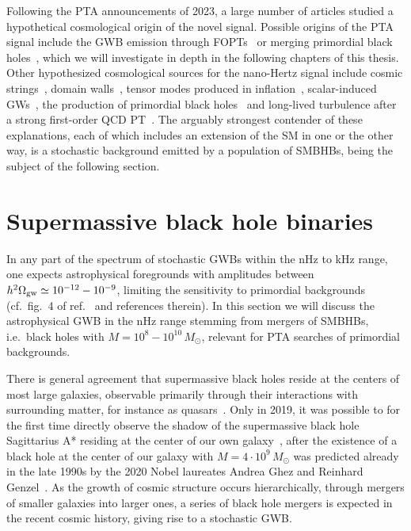 Following the \ac{PTA} announcements of 2023, a large number of articles studied a hypothetical cosmological origin of the novel signal. Possible origins of the \ac{PTA} signal include the \ac{GWB} emission through \acp{FOPT}~\cite{Nakai:2020oit, Ratzinger:2020koh, NANOGrav:2021flc, Bringmann:2023opz, Madge:2023cak} or merging primordial black holes~\cite{Depta:2023qst, Gouttenoire:2023nzr}, which we will investigate in depth in the following chapters of this thesis. Other hypothesized cosmological sources for the nano-Hertz signal include cosmic strings~\cite{Ellis:2023tsl, Buchmuller:2023aus, Blasi:2020mfx, Ellis:2020ena, Buchmuller:2020lbh}, domain walls~\cite{Gouttenoire:2023ftk}, tensor modes produced in inflation~\cite{Vagnozzi:2023lwo,Vagnozzi:2020gtf,Ashoorioon:2022raz}, scalar-induced \acp{GW}~\cite{Dandoy:2023jot}, the production of primordial black holes~\cite{DeLuca:2020agl, Kohri:2020qqd, Vaskonen:2020lbd,Unal:2020mts,Ashoorioon:2022raz} and long-lived turbulence after a strong first-order \ac{QCD} \ac{PT}~\cite{RoperPol:2022iel}. The arguably strongest contender of these explanations, each of which includes an extension of the \ac{SM} in one or the other way, is a stochastic background emitted by a population of \acp{SMBHB}, being the subject of the following section.

\section{Supermassive black hole binaries} \label{sec:SMBHBs}

In any part of the spectrum of stochastic \acp{GWB} within the nHz to kHz range, one expects astrophysical foregrounds with amplitudes between $h^2 \Omega_{\text{gw}} \simeq 10^{-12} - 10^{-9}$, limiting the  sensitivity to primordial backgrounds (cf.~fig.~4 of ref.~\cite{Ghoshal:2023pcx} and references therein). In this section we will discuss the astrophysical \ac{GWB} in the nHz range stemming from mergers of \acp{SMBHB}, i.e.~black holes with $M = 10^8 - 10^{10} \, M_\odot$, relevant for \ac{PTA} searches of primordial backgrounds.

There is general agreement that supermassive black holes reside at the centers of most large galaxies, observable primarily through their interactions with surrounding matter, for instance as quasars~\cite{Kormendy:1995er, Magorrian:1997hw}. Only in 2019, it was possible to for the first time  directly observe the shadow of the supermassive black hole Sagittarius A* residing at the center of our own galaxy~\cite{EventHorizonTelescope:2019dse}, after the existence of a black hole at the center of our galaxy with $M = 4 \cdot 10^9 \, M_\odot$ was predicted already in the late 1990s by the 2020 Nobel laureates Andrea Ghez and Reinhard Genzel~\cite{Ghez:1998ph, Eckart:1996zz}. As the growth of cosmic structure occurs hierarchically, through mergers of smaller galaxies into larger ones, a series of black hole mergers is expected in the recent cosmic history, giving rise to a stochastic \ac{GWB}.

